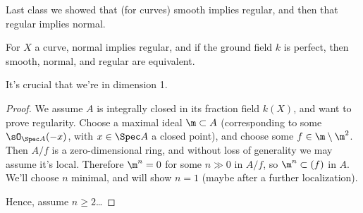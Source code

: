 Last class we showed that (for curves) smooth implies regular, and then that regular implies normal.
\begin{prop}
For $X$ a curve, normal implies regular, and if the ground field $k$ is perfect, then smooth, normal, and regular
are equivalent.
\end{prop}
It's crucial that we're in dimension 1.
\begin{proof}
We assume $A$ is integrally closed in its fraction field $k(X)$, and want to prove regularity. Choose a maximal
ideal $\m\subset A$ (corresponding to some $\sO_{\Spec A}(-x)$, with $x\in\Spec A$ a closed point), and choose some
$f\in\m\setminus\m^2$. Then $A/f$ is a zero-dimensional ring, and without loss of generality we may assume it's
local. Therefore $\m^n = 0$ for some $n\gg 0$ in $A/f$, so $\m^n\subset(f)$ in $A$. We'll choose $n$ minimal, and
will show $n = 1$ (maybe after a further localization).

Hence, assume $n\ge 2$\dots \TODO
\end{proof}
